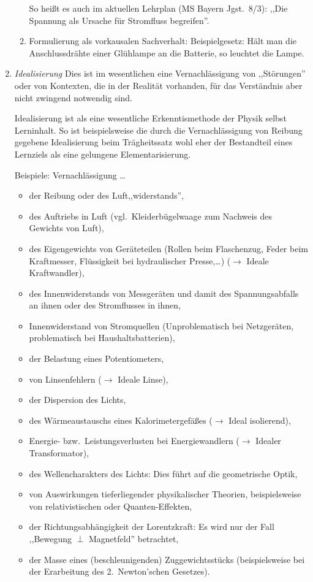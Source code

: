 \begin{enumerate}
\begin{enumerate}
\mip
So hei{\ss}t es auch im aktuellen Lehrplan (MS Bayern Jgst.\ 8/3):
,,Die Spannung als Ursache f\"{u}r Stromfluss begreifen''.

\item
Formulierung als vorkausalen Sachverhalt:
Beispielgesetz: H\"{a}lt man die Anschlussdr\"{a}hte einer Gl\"{u}hlampe an die
Batterie, so leuchtet die Lampe.
\end{enumerate}

\item { \it Idealisierung }
Dies ist im wesentlichen eine Vernachl\"{a}ssigung von
,,St\"{o}rungen'' oder von Kontexten, die in der Realit\"{a}t vorhanden,
f\"{u}r das Verst\"{a}ndnis aber nicht zwingend notwendig sind.

Idealisierung ist als eine wesentliche
Erkenntismethode der Physik selbst Lerninhalt.
So ist beispielsweise die durch die Vernachl\"{a}ssigung von
Reibung gegebene Idealisierung beim Tr\"{a}gheitssatz wohl eher der
Bestandteil eines Lernziels als eine gelungene
Elementarisierung.

\mip
Beispiele:
Vernachl\"{a}ssigung \dots
\begin{itemize}
\item
der Reibung oder des Luft,,widerstands'',
\item
des Auftriebs in Luft (vgl.\ Kleiderb\"{u}gelwaage zum Nachweis
des Gewichts von Luft),
\item
des Eigengewichts von Ger\"{a}teteilen (Rollen beim Flaschenzug,
Feder beim Kraftmesser, Fl\"{u}s\-sig\-keit bei hydraulischer
Presse,\dots) ($\to$ Ideale Kraftwandler),
\item
des Innenwiderstands von Messger\"{a}ten und damit des Spannungsabfalls
an ihnen oder des Stromflusses in ihnen,
\item
Innenwiderstand von Stromquellen (Unproblematisch bei Netzger\"{a}ten,
problematisch bei Haushalts\-batterien),
\item
der Belastung eines Potentiometers,
\item
von Linsenfehlern ($\to$ Ideale Linse),
\item
der Dispersion des Lichts,
\item
des W\"{a}rmeaustauschs eines Kalorimetergef\"{a}{\ss}es
($\to$ Ideal isolierend),
\item
Energie- bzw.\ Leistungsverlusten bei Energiewandlern
($\to$ Idealer Transformator),
\item
des Wellencharakters des Lichts: Dies f\"{u}hrt auf die geometrische Optik,
\item
von Auswirkungen tieferliegender physikalischer Theorien,
beispielsweise von relativistischen oder Quanten-Effekten,
\item
der Richtungsabh\"{a}ngigkeit der Lorentzkraft: Es wird nur der Fall
,,Bewegung $\perp$ Magnetfeld'' betrachtet,
\item der Masse eines (beschleunigenden) Zuggewichtsst\"{u}cks
(beispielsweise bei der Erarbeitung des 2.\ Newton'schen Gesetzes).
\end{itemize}



\end{enumerate}
